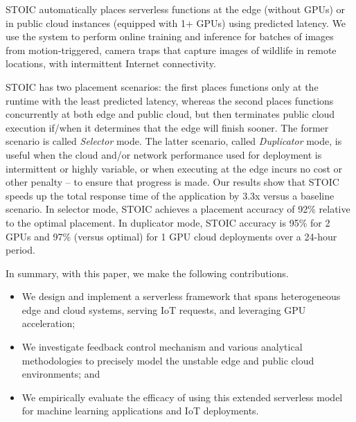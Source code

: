 STOIC automatically places serverless functions at the edge (without GPUs) or in public cloud instances (equipped with 1+ GPUs) using predicted latency.
We use the system to perform online training and inference for batches of images from motion-triggered, camera traps that capture images of wildlife in remote locations, with intermittent Internet connectivity.


STOIC has two placement scenarios: the first places functions only at the runtime with the least predicted latency, whereas the second places functions concurrently at both edge and public cloud, but then terminates public cloud execution if/when it determines that the edge will finish sooner. The former scenario is called \textit{Selector} mode. The latter scenario, called \textit{Duplicator} mode, is useful when the cloud and/or network performance used for deployment is intermittent or highly variable, or when executing at the edge incurs no cost or other penalty -- to ensure that progress is made. Our results show that STOIC speeds up the total response time of the application by 3.3x versus a baseline scenario. In selector mode, STOIC achieves a placement accuracy of 92\% relative to the optimal placement.  In duplicator mode, STOIC accuracy is 95\% for 2 GPUs and 97\% (versus optimal) for 1 GPU cloud deployments over a 24-hour period.

In summary, with this paper, we make the following contributions.
\begin{itemize}
\item We design and implement a serverless framework that spans heterogeneous edge and cloud systems, serving IoT requests, and leveraging GPU acceleration;
\item We investigate feedback control mechanism and various analytical methodologies to precisely model the unstable edge and public cloud environments; and 
\item We empirically evaluate the efficacy of using this extended serverless model for machine learning applications and IoT deployments.
\end{itemize}

